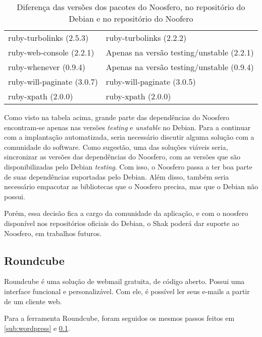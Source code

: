 \begin{table}[H]
\begin{tabular}{l|l}
        ruby-turbolinks (2.5.3)                          & ruby-turbolinks (2.2.2)                                  \\
        ruby-web-console (2.2.1)                         & Apenas na versão testing/unstable (2.2.1)                                  \\
        ruby-whenever (0.9.4)                            & Apenas na versão testing/unstable (0.9.4)                                  \\
        ruby-will-paginate (3.0.7)                       & ruby-will-paginate (3.0.5)                                  \\
        ruby-xpath (2.0.0)                               & ruby-xpath (2.0.0)                                  \\
        \hline
    \end{tabular}
\caption{Diferença das versões dos pacotes do Noosfero, no repositório do Debian e no repositório do Noofero}
\label{tabela1}
\end{table}

Como visto na tabela acima, grande parte das dependências do Noosfero encontram-se
 apenas nas versões \textit{testing} e \textit{unstable} no Debian. Para a continuar com
a implantação automatizada, seria necessário discutir alguma solução 
com a comunidade do software. Como sugestão, uma das soluções viáveis seria, 
sincronizar as versões das dependências do Noosfero, com as versões que são 
disponibilizadas pelo Debian \textit{testing}. Com isso, o 
Noosfero passa a ter boa parte de suas dependências suportadas pelo Debian. Além disso, 
também seria necessário empacotar as bibliotecas que o Noosfero precisa, mas 
que o Debian não possui. 

Porém, essa decisão fica a cargo da comunidade da aplicação, e com o noosfero disponível
nos repositórios oficiais do Debian, o Shak poderá dar suporte ao Noosfero, 
em trabalhos futuros.

 \subsection{Roundcube}
\label{sub:owncloud}

Roundcube  é uma solução de webmail gratuita, de código 
aberto. Possui uma interface funcional e personalizável. Com ele, é possível
ler seus e-mails a partir de um cliente web. 

Para a ferramenta Roundcube, foram seguidos os mesmos passos feitos em 
\ref{sub:wordpress} e \ref{sub:owncloud}.

